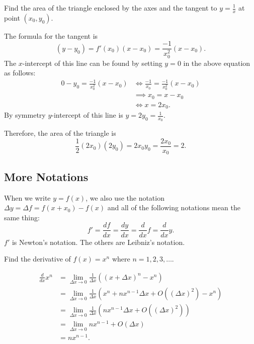\begin{problem}
Find the area of the triangle enclosed by the axes and the tangent to \(
y = \frac{1}{x} \) at point \( (x_0, y_0) \).
\end{problem}
\begin{solution}
The formula for the tangent is
\[
    (y - y_0) = f'(x_0) (x - x_0) = \frac{-1}{x_0^2} (x - x_0).
\]
The \( x \)-intercept of this line can be found by setting \( y = 0 \)
in the above equation as follows:
\begin{align*}
    0 - y_0 = \frac{-1}{x_0^2} (x - x_0)
        & \iff \frac{-1}{x_0} = \frac{-1}{x_0^2} (x - x_0) \\
        & \implies x_0 = x - x_0 \\
        & \iff x = 2x_0.
\end{align*}
By symmetry \( y \)-intercept of this line is \( y = 2y_0 =
\frac{1}{x_0} \).

Therefore, the area of the triangle is
\[
    \frac{1}{2} (2x_0) (2y_0) = 2x_0 y_0 = \frac{2x_0}{x_0} = 2.
\]
\end{solution}


\subsection{More Notations}

When we write \( y = f(x) \), we also use the notation \( \Delta y =
\Delta f = f(x + x_0) - f(x) \) and all of the following notations mean
the same thing:
\[
    f' = \frac{df}{dx} = \frac{dy}{dx} = \frac{d}{dx} f = \frac{d}{dx} y.
\]
\( f' \) is Newton's notation. The others are Leibniz's notation.

\begin{example}
Find the derivative of \( f(x) = x^n \) where \( n = 1, 2, 3, \dots \).
\end{example}
\begin{solution}
\begin{align*}
\frac{d}{dx} x^n
    & = \lim_{\Delta x \to 0} \frac{1}{\Delta x}
        \left( (x + \Delta x)^n - x^n \right) \\
    & = \lim_{\Delta x \to 0} \frac{1}{\Delta x}
        \left( x^n + nx^{n - 1} \Delta x + O(\left(\Delta x\right)^2) -
               x^n \right) \\
    & = \lim_{\Delta x \to 0} \frac{1}{\Delta x}
        \left( nx^{n - 1} \Delta x + O(\left(\Delta x\right)^2) \right) \\
    & = \lim_{\Delta x \to 0} nx^{n - 1} + O(\Delta x) \\
    & = nx^{n - 1}.
\end{align*}
\end{solution}
